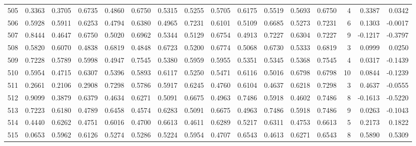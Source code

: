 \begin{tabular}{lrrrrrrrrrrrrrrr}
505 &      0.3363 &  0.3705 &  0.6735 &  0.4860 &  0.6750 &  0.5315 &  0.5255 &  0.5705 &  0.6175 &  0.5519 &   0.5693 &     0.6750 &      4 &                    0.3387 &                     0.0342 \\
506 &      0.5928 &  0.5911 &  0.6253 &  0.4794 &  0.6380 &  0.4965 &  0.7231 &  0.6101 &  0.5109 &  0.6685 &   0.5273 &     0.7231 &      6 &                    0.1303 &                    -0.0017 \\
507 &      0.8444 &  0.4647 &  0.6750 &  0.5020 &  0.6962 &  0.5344 &  0.5129 &  0.6754 &  0.4913 &  0.7227 &   0.6304 &     0.7227 &      9 &                   -0.1217 &                    -0.3797 \\
508 &      0.5820 &  0.6070 &  0.4838 &  0.6819 &  0.4848 &  0.6723 &  0.5200 &  0.6774 &  0.5068 &  0.6730 &   0.5333 &     0.6819 &      3 &                    0.0999 &                     0.0250 \\
509 &      0.7228 &  0.5789 &  0.5998 &  0.4947 &  0.7545 &  0.5380 &  0.5959 &  0.5955 &  0.5351 &  0.5345 &   0.5368 &     0.7545 &      4 &                    0.0317 &                    -0.1439 \\
510 &      0.5954 &  0.4715 &  0.6307 &  0.5396 &  0.5893 &  0.6117 &  0.5250 &  0.5471 &  0.6116 &  0.5016 &   0.6798 &     0.6798 &     10 &                    0.0844 &                    -0.1239 \\
511 &      0.2661 &  0.2106 &  0.2908 &  0.7298 &  0.5786 &  0.5917 &  0.6245 &  0.4760 &  0.6104 &  0.4637 &   0.6218 &     0.7298 &      3 &                    0.4637 &                    -0.0555 \\
512 &      0.9099 &  0.3879 &  0.6379 &  0.4634 &  0.6271 &  0.5091 &  0.6675 &  0.4963 &  0.7486 &  0.5918 &   0.4602 &     0.7486 &      8 &                   -0.1613 &                    -0.5220 \\
513 &      0.7223 &  0.6180 &  0.4789 &  0.6458 &  0.4574 &  0.6283 &  0.5091 &  0.6675 &  0.4963 &  0.7486 &   0.5918 &     0.7486 &      9 &                    0.0263 &                    -0.1043 \\
514 &      0.4440 &  0.6262 &  0.4751 &  0.6016 &  0.4700 &  0.6613 &  0.4611 &  0.6289 &  0.5217 &  0.6311 &   0.4753 &     0.6613 &      5 &                    0.2173 &                     0.1822 \\
515 &      0.0653 &  0.5962 &  0.6126 &  0.5274 &  0.5286 &  0.5224 &  0.5954 &  0.4707 &  0.6543 &  0.4613 &   0.6271 &     0.6543 &      8 &                    0.5890 &                     0.5309 \\

\end{tabular}
